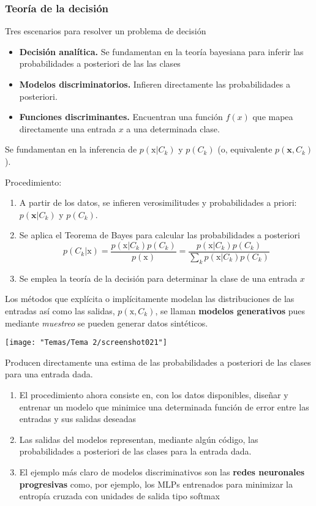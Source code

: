 \subsubsection{Teoría de la decisión}
Tres escenarios para resolver un problema de decisión
\begin{itemize}
	\item \textbf{Decisión analítica.} Se fundamentan en la teoría bayesiana para inferir las probabilidades a posteriori de las las clases
	\item \textbf{Modelos discriminatorios.} Infieren directamente las probabilidades a posteriori.
	\item \textbf{Funciones discriminantes.} Encuentran una función $f(x)$ que mapea directamente una entrada $x$ a una determinada clase.
\end{itemize}
Se fundamentan en la inferencia de $p(\mathrm{x}|C_k)$ y $p(C_k)$ (o, equivalente $p(\mathbf{x},C_k)$).
\begin{minipage}{0.6\textwidth}
	Procedimiento:
	\begin{enumerate}[label=\color{lightblue}\arabic*)]
		\item A partir de los datos, se infieren verosimilitudes y probabilidades a priori: $p(\mathbf{x}|C_k)$ y $p(C_k)$.
		\item Se aplica el Teorema de Bayes para calcular las probabilidades a posteriori \[ p(C_k|\mathrm{x})=\dfrac{p(\mathrm{x}|C_k)p(C_k)}{p(\mathrm{x})}=\dfrac{p(\mathrm{x}|C_k)p(C_k)}{\displaystyle\sum_kp(\mathrm{x}|C_k)p(C_k)} \]
		\item Se emplea la teoría de la decisión para determinar la clase de una entrada $x$
	\end{enumerate}
	Los métodos que explícita o implícitamente modelan las distribuciones de las entradas así como las salidas, $p(\mathrm{x},C_k)$, se llaman \textbf{modelos generativos} pues mediante \textit{muestreo} se pueden generar datos sintéticos.
\end{minipage}\qquad\begin{minipage}{0.4\textwidth}
\begin{center}
	\texttt{[image: "Temas/Tema 2/screenshot021"]}
\end{center}
\end{minipage}
Producen directamente una estima de las probabilidades a posteriori de las clases para una entrada dada.
\begin{enumerate}[label=\color{lightblue}\arabic*)]
	\item El procedimiento ahora consiste en, con los datos disponibles, diseñar y entrenar un modelo que minimice una determinada función de error entre las entradas y sus salidas deseadas
	\item Las salidas del modelos representan, mediante algún código, las probabilidades a posteriori de las clases para la entrada dada.
	\item El ejemplo más claro de modelos discriminativos son las \textbf{redes neuronales progresivas} como, por ejemplo, los MLPs entrenados para minimizar la entropía cruzada con unidades de salida tipo softmax
\end{enumerate}
